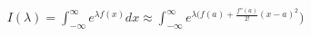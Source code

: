 \documentclass[preview]{standalone}
\begin{document}
\begin{align*}
I(\lambda) = \displaystyle \int_{-\infty}^{\infty} e^{\lambda f(x)} dx \approx \displaystyle \int_{-\infty}^{\infty} e^{\lambda (f(a) + \frac{f''(a)}{2!}(x - a)^2})
\end{align*}
\end{document}
